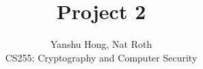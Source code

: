 \documentclass[12pt]{article}
\newenvironment{question}[2][Question]{\begin{trivlist}
\item[\hskip \labelsep {\bfseries #1}\hskip \labelsep {\bfseries #2.}]}{\end{trivlist}}
\begin{document}
\title{Project 2}
\author{Yanshu Hong, Nat Roth\\ 
CS255: Cryptography and Computer Security} 

\maketitle 
 

\begin{question}{1}


\end{question}



\begin{question}{2}


\end{question}



\begin{question}{3} 


\end{question}



\begin{question}{4} 


\end{question}



\begin{question}{5} 


\end{question}

 
 
\end{document}

